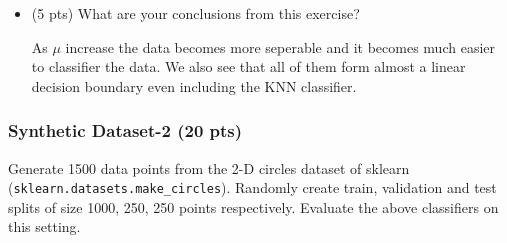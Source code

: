 \documentclass[a4paper]{article}
\theoremstyle{definition}
\newenvironment{soln}{
    \leavevmode\color{blue}\ignorespaces
}{}
\begin{document}
\begin{itemize}
\begin{figure}[H]
     \end{figure}
     \item (5 pts) What are your conclusions from this exercise?
     
     \begin{soln}
         As $\mu$ increase the data becomes more seperable and it becomes much easier to classifier the data. We also see that all of them form almost a linear decision boundary even including the KNN classifier.
     \end{soln}
 \end{itemize}
 
 \subsubsection{Synthetic Dataset-2  (20 pts) }
 Generate 1500 data points from the 2-D circles dataset of sklearn (\texttt{sklearn.datasets.make\_circles}). Randomly create train, validation and test splits of size 1000, 250, 250 points respectively. Evaluate the above classifiers on this setting.
\end{document}
